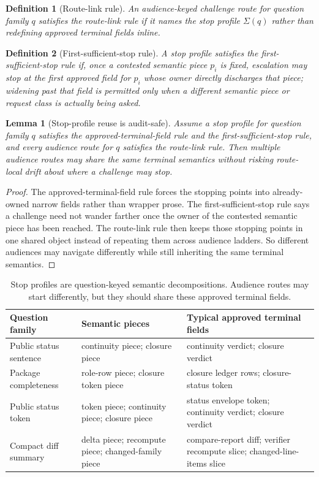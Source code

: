 \documentclass[11pt]{article}
\newtheorem{definition}{Definition}
\newtheorem{lemma}{Lemma}
\begin{document}
\begin{definition}[Route-link rule]
An audience-keyed challenge route for question family $q$ satisfies the \emph{route-link rule} if it names the stop profile $\Sigma(q)$ rather than redefining approved terminal fields inline.
\end{definition}

\begin{definition}[First-sufficient-stop rule]
A stop profile satisfies the \emph{first-sufficient-stop rule} if, once a contested semantic piece $p_i$ is fixed, escalation may stop at the first approved field for $p_i$ whose owner directly discharges that piece; widening past that field is permitted only when a different semantic piece or request class is actually being asked.
\end{definition}

\begin{lemma}[Stop-profile reuse is audit-safe]
Assume a stop profile for question family $q$ satisfies the approved-terminal-field rule and the first-sufficient-stop rule, and every audience route for $q$ satisfies the route-link rule.
Then multiple audience routes may share the same terminal semantics without risking route-local drift about where a challenge may stop.
\end{lemma}

\begin{proof}
The approved-terminal-field rule forces the stopping points into already-owned narrow fields rather than wrapper prose.
The first-sufficient-stop rule says a challenge need not wander farther once the owner of the contested semantic piece has been reached.
The route-link rule then keeps those stopping points in one shared object instead of repeating them across audience ladders.
So different audiences may navigate differently while still inheriting the same terminal semantics.
\end{proof}

\begin{table}[t]
\centering
\small
\begin{tabularx}{\linewidth}{@{}l X X@{}}
\toprule
Question family & Semantic pieces & Typical approved terminal fields \\
\midrule
Public status sentence & continuity piece; closure piece & continuity verdict; closure verdict \\
Package completeness & role-row piece; closure token piece & closure ledger rows; closure-status token \\
Public status token & token piece; continuity piece; closure piece & status envelope token; continuity verdict; closure verdict \\
Compact diff summary & delta piece; recompute piece; changed-family piece & compare-report diff; verifier recompute slice; changed-line-items slice \\
\bottomrule
\end{tabularx}
\caption{Stop profiles are question-keyed semantic decompositions. Audience routes may start differently, but they should share these approved terminal fields.}
\label{tab:stopprofiles}
\end{table}
\end{document}
